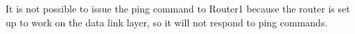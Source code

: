 It is not possible to issue the ping command to Router1 because the router is set up
to work on the data link layer, so it will not respond to ping commands.
